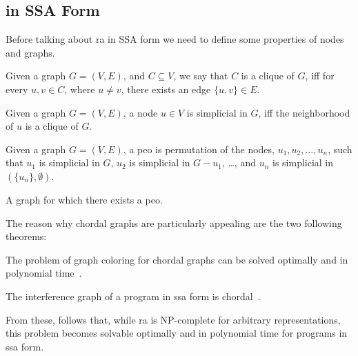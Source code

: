 \subsection{ in SSA Form}
\label{subsec:ssara}

Before talking about \gls{ra} in SSA form we need to define some properties of nodes and graphs.

\begin{definition}[Clique]\label{def:clique}
  Given a graph $G = (V, E)$, and $C \subseteq V$, we say that $C$ is a clique of $G$, iff for every $u, v \in C$, where $u \neq v$, there exists an edge $\{ u, v \} \in E$.
\end{definition}

\begin{definition}\label{def:simplicial}
  Given a graph $G = (V, E)$, a node $u \in V$ is simplicial in $G$, iff the neighborhood of $u$ is a clique of $G$.
\end{definition}

\begin{definition}\label{def:peo}
  Given a graph $G = (V, E)$, a \gls{peo} is permutation of the nodes, $u_1, u_2, \dots, u_n$, such that $u_1$ is simplicial in $G$, $u_2$ is simplicial in $G - u_1$, \dots, and $u_n$ is simplicial in $(\{ u_n \}, \emptyset)$.
\end{definition}

\begin{definition}\label{def:chordal1}
  A graph for which there exists a \gls{peo}.
\end{definition}

The reason why chordal graphs are particularly appealing are the two following theorems:

\begin{theorem}
  The problem of graph coloring for chordal graphs can be solved optimally and in polynomial time~\cite{golumbic2004algorithmic}.
\end{theorem}

\begin{theorem}
  The interference graph of a program in \gls{ssa} form is chordal~\cite{HGG:2006:RA-SSA}.
\end{theorem}

From these, follows that, while \gls{ra} is NP-complete for arbitrary representations, this problem becomes solvable optimally and in polynomial time for programs in \gls{ssa} form.

